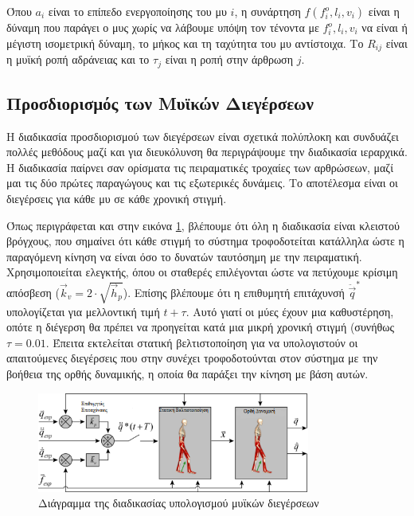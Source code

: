 Όπου $a_i$ είναι το επίπεδο ενεργοποίησης του μυ $i$, η συνάρτηση $f(f^{o}_{i}, l_{i}, v_{i})$ είναι η δύναμη που παράγει ο μυς χωρίς να λάβουμε υπόψη τον τένοντα με $f^{o}_{i}, l_{i}, v_{i}$ να είναι ή μέγιστη ισομετρική δύναμη, το μήκος και τη ταχύτητα του μυ αντίστοιχα. Το $R_{ij}$ είναι η μυϊκή ροπή αδράνειας και το $\tau_{j}$ είναι η ροπή στην άρθρωση $j$.

\subsection{Προσδιορισμός των Μυϊκών Διεγέρσεων}

Η διαδικασία προσδιορισμού των διεγέρσεων είναι σχετικά πολύπλοκη και συνδυάζει πολλές μεθόδους μαζί και για διευκόλυνση θα περιγράψουμε την διαδικασία ιεραρχικά. Η διαδικασία παίρνει σαν ορίσματα τις πειραματικές τροχαίες των αρθρώσεων, μαζί μαι τις δύο πρώτες παραγώγους και τις εξωτερικές δυνάμεις. Το αποτέλεσμα είναι οι διεγέρσεις για κάθε μυ σε κάθε χρονική στιγμή.

Όπως περιγράφεται και στην εικόνα \ref{fig:cmc-diagram}, βλέπουμε ότι όλη η διαδικασία είναι κλειστού βρόγχους, που σημαίνει ότι κάθε στιγμή το σύστημα τροφοδοτείται κατάλληλα ώστε η παραγόμενη κίνηση να είναι όσο το δυνατών ταυτόσημη με την πειραματική. Χρησιμοποιείται  ελεγκτής, όπου οι σταθερές επιλέγονται ώστε να πετύχουμε κρίσιμη απόσβεση ($\overrightarrow{k}_v = 2 \cdot \sqrt{\overrightarrow{h}_p}$). Επίσης βλέπουμε ότι η επιθυμητή επιτάχυνσή $\ddot{\overrightarrow{q}}^{*}$ υπολογίζεται για μελλοντική τιμή $t + \tau $. Αυτό γιατί οι μύες έχουν μια καθυστέρηση, οπότε η διέγερση θα πρέπει να προηγείται κατά μια μικρή χρονική στιγμή (συνήθως $\tau = 0.01$. Έπειτα εκτελείται στατική βελτιστοποίηση για να υπολογιστούν οι απαιτούμενες διεγέρσεις που στην συνέχει τροφοδοτούνται στον σύστημα με την βοήθεια της ορθής δυναμικής, η οποία θα παράξει την κίνηση με βάση αυτών.

\begin{figure}[H]
    \centering
    \includegraphics[width=0.8\textwidth]{fig/cmc-diagram.png}
    \caption{Διάγραμμα της διαδικασίας υπολογισμού μυϊκών διεγέρσεων \cite{thelen06}}
    \label{fig:cmc-diagram}
\end{figure}

